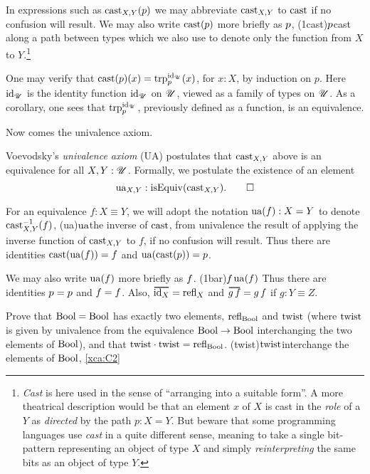 In expressions such as $\cast_{X,Y}(p)$ we may abbreviate $\cast_{X,Y}$ to $\cast$ if 
no confusion will result. We may also write $\cast (p)$ more briefly as ${p}$,%
\glossary(1cast){$\protect{p}$}{cast along a path between types}
which we also use to denote only the function from $X$ to $Y$.\footnote{%
    \emph{Cast} is here used in the sense of
    ``arranging into a suitable form''.
    A more theatrical description would be that
    an element $x$ of $X$ is cast in the \emph{role} of a $Y$
    as \emph{directed} by the path $p : X = Y$.
    But beware that some programming languages use \emph{cast}
    in a quite different sense, meaning to take a
    single bit-pattern representing an object of type $X$
    and simply \emph{reinterpreting} the same bits
    as an object of type $Y$.}

One may verify that $\cast(p)(x) = \trp[\id_\UU]{ p} (x)$, for $x : X$, by induction on $p$.
Here $\mathord{\mathrm{id}}_{\mathscr{U}}$ is the identity function $\mathord{\mathrm{id}}_{\mathscr{U}}$ on ${\mathscr{U}}$, viewed as a family of types on ${\mathscr{U}}$. 
As a corollary, one sees that $\trp[\id_\UU]{ p}$, previously defined as a function, is an equivalence.

Now comes the univalence axiom.

\begin{principle}\label{def:univalence}
  Voevodsky's \emph{univalence axiom} (UA)%
   postulates that
$\cast_{X,Y}$ above is an equivalence for all $X,Y:{\mathscr{U}}$.
Formally, we postulate the existence of an element
\[
  \ua_{X,Y} : \isEq(\cast_{X,Y}).\qedhere
\]
\end{principle}

For an equivalence $f: X\equiv Y$, we will adopt the notation $\ua(f) : X = Y $ to denote $\cast_{X,Y}^{-1}(f)$,%
\glossary(ua){$\protect\ua$}{the inverse of $\protect\cast$, from univalence}
the result of applying the
inverse function of $\cast_{X,Y}$ to $f$, if no confusion will result.  Thus there are identities $\cast (\ua (f)) = f$ and $\ua (\cast (p)) = p$.

We may also write $\ua (f)$ more briefly as ${f}$.%
\glossary(1bar){$\protect{f}$}{$\protect\ua(f)$}
Thus there are identities ${{p}} = p$ and ${{f}} = f$. Also, $\overetop{\id_X}=\refl{X}$
and $\overetop{g\,f}=\etop{g}\,\etop{f}$ if $g: Y\equiv Z$.

\begin{xca}\label{xca:C2}
Prove that $\mathrm{Bool}=\mathrm{Bool}$ has exactly two elements, 
$\mathrm{refl}_{\mathrm{Bool}}$ and $\mathrm{twist}$ (where $\mathrm{twist}$ is given by 
univalence from the equivalence $\mathrm{Bool}\to\mathrm{Bool}$ interchanging 
the two elements of $\mathrm{Bool}$), and that $\mathrm{twist}\cdot\mathrm{twist}=\mathrm{refl}_{\mathrm{Bool}}$.%
\glossary(twist){$\protect\mathrm{twist}$}{interchange the elements of $\mathrm{Bool}$,
  \cref{xca:C2}}
\end{xca}

